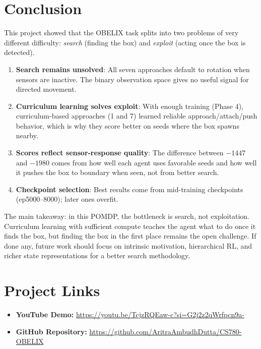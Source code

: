 \documentclass[10.5pt, oneside]{article}
\begin{document}
\section{Conclusion}

This project showed that the OBELIX task splits into two problems of very different difficulty: \textit{search} (finding the box) and \textit{exploit} (acting once the box is detected).

\begin{enumerate}[nosep]
    \item \textbf{Search remains unsolved}: All seven approaches default to rotation when sensors are inactive. The binary observation space gives no useful signal for directed movement.
    \item \textbf{Curriculum learning solves exploit}: With enough training (Phase 4), curriculum-based approaches (1 and 7) learned reliable approach/attach/push behavior, which is why they score better on seeds where the box spawns nearby.
    \item \textbf{Scores reflect sensor-response quality}: The difference between $-1447$ and $-1980$ comes from how well each agent uses favorable seeds and how well it pushes the box to boundary when seen, not from better search.
    \item \textbf{Checkpoint selection}: Best results come from mid-training checkpoints (ep5000--8000); later ones overfit.
\end{enumerate}
\hfill \break
The main takeaway: in this POMDP, the bottleneck is search, not exploitation. Curriculum learning with sufficient compute teaches the agent what to do once it finds the box, but finding the box in the first place remains the open challenge. If done any, future work should focus on intrinsic motivation, hierarchical RL, and richer state representations for a better search methodology.

\section*{Project Links}
\begin{itemize}[nosep]
    \item \textbf{YouTube Demo:} \url{https://youtu.be/TcjzRQEaw-c?si=G2j2z2qWrfpcn9a-}
    \item \textbf{GitHub Repository:} \url{https://github.com/AritraAmbudhDutta/CS780-OBELIX}
\end{itemize}
\end{document}
